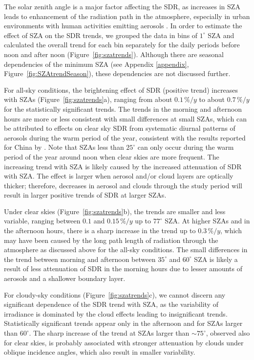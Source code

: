 \documentclass[applsci,article,submit,moreauthors,pdftex]{Definitions/mdpi}
\begin{document}
The solar zenith angle is a major factor affecting the SDR, as increases
in SZA leads to enhancement of the radiation path in the atmosphere,
especially in urban environments with human activities emitting aerosols
\citep{Wang2021}. In order to estimate the effect of SZA on the SDR
trends, we grouped the data in bins of \(1^\circ\) SZA and calculated
the overall trend for each bin separately for the daily periods before
noon and after noon (Figure~\ref{fig:szatrends}). Although there are
seasonal dependencies of the minimum SZA (see Appendix \ref{appendix},
Figure~\ref{fig:SZAtrendSeason}), these dependencies are not discussed
further.

For all-sky conditions, the brightening effect of SDR (positive trend)
increases with SZAs (Figure~\ref{fig:szatrends}a), ranging from about
\(0.1\,\%/y\) to about \(0.7\,\%/y\) for the statistically significant
trends. The trends in the morning and afternoon hours are more or less
consistent with small differences at small SZAs, which can be attributed
to effects on clear sky SDR from systematic diurnal patterns of aerosols
during the warm period of the year, consistent with the results reported
for China by \citet{Wang2021}. Note that SZAs less than \(25^\circ\) can
only occur during the warm period of the year around noon when clear
skies are more frequent. The increasing trend with SZA is likely caused
by the increased attenuation of SDR with SZA. The effect is larger when
aerosol and/or cloud layers are optically thicker; therefore, decreases
in aerosol and clouds through the study period will result in larger
positive trends of SDR at larger SZAs.

Under clear skies (Figure~\ref{fig:szatrends}b), the trends are smaller
and less variable, ranging between \(0.1\) and \(0.15\,\%/y\) up to
\(77^\circ\) SZA. At higher SZAs and in the afternoon hours, there is a
sharp increase in the trend up to \(0.3\,\%/y\), which may have been
caused by the long path length of radiation through the atmosphere as
discussed above for the all-sky conditions. The small differences in the
trend between morning and afternoon between \(35^\circ\) and
\(60^\circ\) SZA is likely a result of less attenuation of SDR in the
morning hours due to lesser amounts of aerosols and a shallower boundary
layer.

For cloudy-sky conditions (Figure~\ref{fig:szatrends}c), we cannot
discern any significant dependence of the SDR trend with SZA, as the
variability of irradiance is dominated by the cloud effects leading to
insignificant trends. Statistically significant trends appear only in
the afternoon and for SZAs larger than \(60^\circ\). The sharp increase
of the trend at SZAs larger than \(\sim{75}^{\circ}\), observed also for
clear skies, is probably associated with stronger attenuation by clouds
under oblique incidence angles, which also result in smaller
variability.
\end{document}
